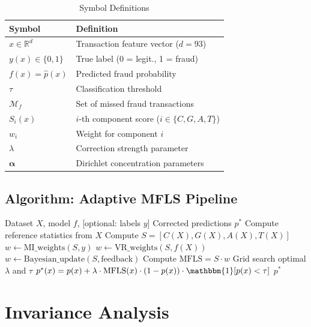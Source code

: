 \documentclass[journal]{IEEEtran}
\newcommand{\MFLS}{\mathrm{MFLS}}
\newcommand{\R}{\mathbb{R}}
\newcommand{\ind}{\mathbbm{1}}
\begin{document}
\begin{table}[!t]
\centering
\caption{Symbol Definitions}
\label{tab:notation}
\begin{tabular}{@{}ll@{}}
\toprule
\textbf{Symbol} & \textbf{Definition} \\
\midrule
$x \in \R^d$ & Transaction feature vector ($d = 93$) \\
$y(x) \in \{0, 1\}$ & True label (0 = legit., 1 = fraud) \\
$f(x) = \hat{p}(x)$ & Predicted fraud probability \\
$\tau$ & Classification threshold \\
$\mathcal{M}_f$ & Set of missed fraud transactions \\
$S_i(x)$ & $i$-th component score ($i \in \{C,G,A,T\}$) \\
$w_i$ & Weight for component $i$ \\
$\lambda$ & Correction strength parameter \\
$\bm{\alpha}$ & Dirichlet concentration parameters \\
\bottomrule
\end{tabular}
\end{table}

\subsection{Algorithm: Adaptive MFLS Pipeline}

\begin{algorithm}[!t]
\caption{Adaptive MFLS Pipeline}
\label{alg:mfls}
\begin{algorithmic}[1]
\REQUIRE Dataset $X$, model $f$, [optional: labels $y$]
\ENSURE Corrected predictions $p^*$
\STATE Compute reference statistics from $X$
\STATE Compute $S = [C(X), G(X), A(X), T(X)]$
  \STATE $w \leftarrow \text{MI\_weights}(S, y)$
  \STATE $w \leftarrow \text{VR\_weights}(S, f(X))$
\ELSE
  \STATE $w \leftarrow \text{Bayesian\_update}(S, \text{feedback})$
\ENDIF
\STATE Compute $\MFLS = S \cdot w$
\STATE Grid search optimal $\lambda$ and $\tau$
\STATE $p^*(x) = p(x) + \lambda \cdot \MFLS(x) \cdot (1-p(x)) \cdot \ind[p(x) < \tau]$
\RETURN $p^*$
\end{algorithmic}
\end{algorithm}

\section{Invariance Analysis}
\label{sec:invariance}
\end{document}
